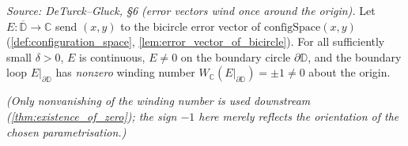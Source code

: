 \begin{lemma}


  \label{lem:error_map_winds_boundary}
  \textit{Source: DeTurck--Gluck, §6 (error vectors wind once around the origin).}
  Let $E : \overline{\mathbb{D}} \to \mathbb{C}$ send $(x,y)$ to the bicircle error
  vector of $\mathrm{configSpace}(x,y)$ (\cref{def:configuration_space},
  \cref{lem:error_vector_of_bicircle}). For all sufficiently small $\delta > 0$,
  $E$ is continuous, $E \ne 0$ on the boundary circle $\partial\mathbb{D}$, and the
  boundary loop $E|_{\partial\mathbb{D}}$ has \emph{nonzero} winding number
  $W_{\mathbb{C}}(E|_{\partial\mathbb{D}}) = \pm 1 \ne 0$ about the origin.

  \emph{(Only nonvanishing of the winding number is used downstream
  (\cref{thm:existence_of_zero}); the sign $-1$ here merely reflects the
  orientation of the chosen parametrisation.)}
\end{lemma}
